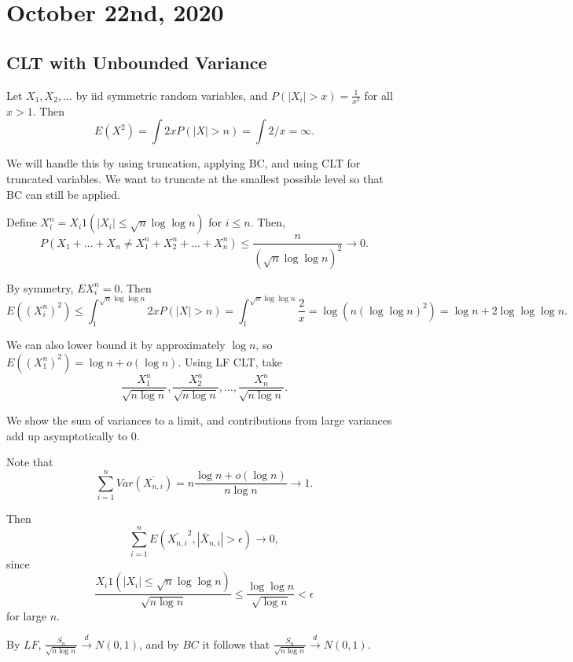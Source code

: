 \documentclass[11pt]{scrartcl}
\begin{document}
\section{October 22nd, 2020}
\subsection{CLT with Unbounded Variance}
Let $X_1, X_2, \dots$ by iid symmetric random variables, and $P(|X_i| > x) = \frac{1}{x^2}$ for all $x > 1 $.  Then
$$E(X^2) = \int 2xP(|X| > n) = \int 2/x = \infty.$$

We will handle this by using truncation, applying BC, and using CLT for truncated variables.  We want to truncate at the smallest possible level so that BC can still be applied.  

Define $X_i^n = X_i 1(|X_i| \le \sqrt{n} \log \log{n})$ for $i \le n$.  Then,
$$P(X_1 + \dots + X_n \ne X_1^n + X_2^n + \dots + X_n^n) \le \frac{n}{(\sqrt{n}\log\log n)^2} \to 0.$$

By symmetry, $EX_i^n = 0$.  Then$$E((X_{i}^n)^2) \le \int_{1}^{\sqrt{n}\log \log n}2xP(|X| > n) = \int_{1}^{\sqrt{n}\log \log n} \frac{2}{x} = \log(n(\log \log n)^2) = \log n + 2\log \log \log n.$$

We can also lower bound it by approximately $\log n$, so $E((X_1^n)^2) = \log n + o(\log n)$.  
Using LF CLT, take $$\frac{X_1^n}{\sqrt{n\log n}},\frac{X_2^n}{\sqrt{n\log n}}, \dots, \frac{X_n^n}{\sqrt{n\log n}}.$$

We show the sum of variances to a limit, and contributions from large variances add up asymptotically to $0$.

Note that 
$$\sum_{i=1}^n Var(\overline{X_{n, i}}) = n\frac{\log n + o(\log n)}{n \log n} \to 1.$$

Then 
$$\sum_{i=1}^n E(\overline{X_{n, i}}^2, |\overline{X}_{n, i}| > \epsilon) \to 0,$$
since $$
\frac{X_i 1(|X_i| \le \sqrt{n }\log \log n)}{\sqrt{n \log n}} \le \frac{\log \log n}{\sqrt{\log n}} < \epsilon$$
for large $n$.

By $LF$, $\frac{\overline{S_n}}{\sqrt{n \log n}} \xrightarrow{d} N(0, 1)$, and by $BC$ it follows that $\frac{S_n}{\sqrt{n \log n}} \xrightarrow{d} N(0, 1).$
\end{document}

